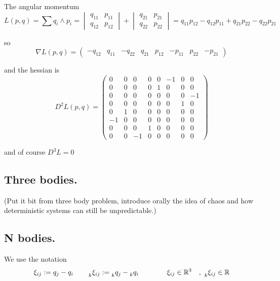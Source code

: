 \documentclass[12pt]{article}
\begin{document}
The angular momentum 
\begin{equation}\label{eq:angular momentum kepler}
    L(p,q) = \sum q_i\wedge p_i = \begin{vmatrix} q_{11} & p_{11}\\ q_{12} & p_{12} \end{vmatrix} + \begin{vmatrix} q_{21} & p_{21}\\ q_{22} & p_{22} \end{vmatrix} = q_{11}p_{12} - q_{12}p_{11} + q_{21}p_{22} - q_{22}p_{21}
\end{equation}

so 
\begin{equation}\label{eq:nabla l kepler}
    \nabla L(p,q) = 
    \begin{pmatrix} 
    -q_{12} & q_{11} & -q_{22} & q_{21} &
    p_{12} & -p_{11} & p_{22} & -p_{21}
    \end{pmatrix}
\end{equation}

and the hessian is
\begin{equation}\label{eq:hessian of angular momentum kepler}
D^2L(p,q) = 
\left(\begin{array}{cccc|cccc}
    0 & 0 & 0 & 0    &    0 & -1 & 0 & 0\\
    0 & 0 & 0 & 0    &    1 & 0 & 0 & 0\\
    0 & 0 & 0 & 0    &    0 & 0 & 0 & -1\\
    0 & 0 & 0 & 0    &    0 & 0 & 1 & 0\\
    \hline
    0 & 1 & 0 & 0    &    0 & 0 & 0 & 0\\
    -1 & 0 & 0 & 0    &    0 & 0 & 0 & 0\\
    0 & 0 & 0 & 1    &    0 & 0 & 0 & 0\\
    0 & 0 & -1 & 0    &    0 & 0 & 0 & 0
\end{array}\right)
\end{equation}

and of course $D^3L =0$


\subsection{Three bodies.}
(Put it bit from three body problem, introduce orally the idea of chaos and how deterministic systems can still be unpredictable.)

\subsection{N bodies.}
We use the notation 
$$
\xi_{ij} := q_j - q_i \qquad \prescript{}{k}{\xi_{ij}} := \prescript{}{k}{q_j} - \prescript{}{k}{q_i} \qquad\qquad \xi_{ij}\in\mathbb{R}^3\quad,\,\, \prescript{}{k}{\xi_{ij}} \in \mathbb{R}
$$
\end{document}

